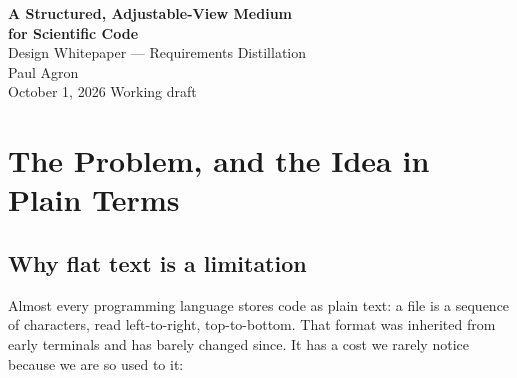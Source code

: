 \documentclass[11pt]{article}
\begin{document}
\begin{center}
{\LARGE\bfseries\color{accent} A Structured, Adjustable-View Medium\\[3pt] for Scientific Code}\\[10pt]
{\large Design Whitepaper --- Requirements Distillation}\\[10pt]
{\large Paul Agron}\\[4pt]
{\color{softgray}\small October 1, 2026 \quad\textbullet\quad Working draft}
\end{center}

\vspace{0.6em}

\begin{abstract}
\noindent Today we write and read programs as flat text --- one long string of characters per file. This document proposes an environment for scientific computing in which a program is stored not as text but as \emph{structure} (essentially, the parsed form of the code), and in which the way that structure is \emph{shown on screen} is something the reader can adjust freely, moment to moment, without changing the program at all. A reader can hide whole categories of clutter (say, all logging), or display a piece of mathematics the way it appears in a textbook (a matrix as a grid, a fraction stacked) rather than squashed onto one line. Crucially, none of these adjustments alter the program; they change only how it is drawn. This paper explains the idea from first principles, states the design rules that keep it honest, lists the concrete features and the limits placed on each, and records both the decisions deliberately postponed for a first prototype and the questions still open. No prior familiarity with structure editors is assumed.
\end{abstract}

\vspace{0.4em}

\section{The Problem, and the Idea in Plain Terms}

\subsection{Why flat text is a limitation}
Almost every programming language stores code as plain text: a file is a sequence of characters, read left-to-right, top-to-bottom. That format was inherited from early terminals and has barely changed since. It has a cost we rarely notice because we are so used to it:
\end{document}
